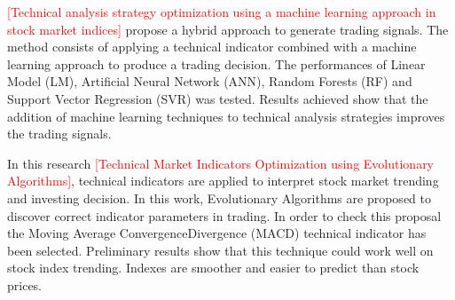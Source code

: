 \documentclass[../main.tex]{subfiles}
\begin{document}
\textcolor{red}{[Technical analysis strategy optimization using a machine learning approach in stock market indices]} propose a hybrid approach to generate trading signals. The method consists of applying a technical indicator combined with a machine learning approach to produce a trading decision. The performances of Linear Model (LM), Artificial Neural Network (ANN), Random Forests (RF) and Support Vector Regression (SVR) was tested. Results achieved show that the addition of machine learning techniques to technical analysis strategies improves the trading signals.
\bigbreak

In this research \textcolor{red}{[Technical Market Indicators Optimization using Evolutionary Algorithms]}, technical indicators are applied to interpret stock market trending and investing decision. In this work, Evolutionary Algorithms are proposed to discover correct indicator parameters in trading. In order to check this proposal the Moving Average ConvergenceDivergence (MACD) technical indicator has been selected. Preliminary results show that this technique could work well on stock index trending. Indexes are smoother and easier to predict than stock prices.
\bigbreak

\end{document}
